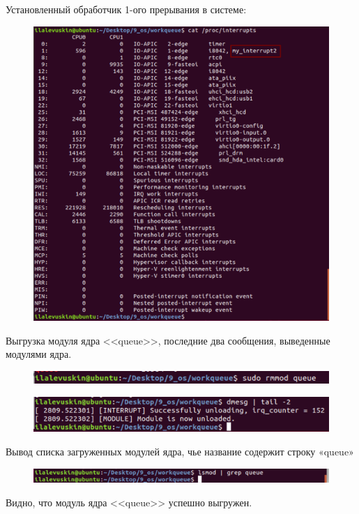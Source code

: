 \documentclass[a4paper,12pt]{article}
\begin{document}
	Установленный обработчик 1-ого прерывания в системе:
	
	\begin{figure}[h!]
		\begin{center}
			{\includegraphics[scale = 0.35]{convert2.png}}
			\label{convert2}
		\end{center}
	\end{figure}
	
	\newpage
	
	Выгрузка модуля ядра <<queue>>, последние два сообщения, выведенные модулями ядра.
	
	\begin{figure}[h!]
		\begin{center}
			{\includegraphics[scale = 0.8]{7.png}}
			\label{7}
		\end{center}
	\end{figure}
	
	\begin{figure}[h!]
		\begin{center}
			{\includegraphics[scale = 0.7]{8.png}}
			\label{8}
		\end{center}
	\end{figure}

	Вывод списка загруженных модулей ядра, чье название содержит строку «queue»
	
	\begin{figure}[h!]
		\begin{center}
			{\includegraphics[scale = 0.7]{8.5.png}}
			\label{8}
		\end{center}
	\end{figure}
	
	Видно, что модуль ядра <<queue>> успешно выгружен.
	
	
\end{document}
